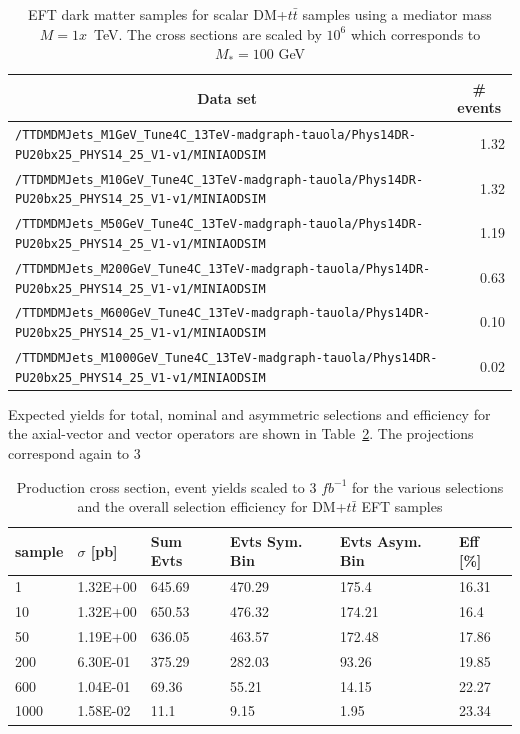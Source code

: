 \begin{table}
    \centering
    \caption{EFT dark matter samples for scalar DM+$t\bar{t}$ samples using a mediator mass $M=1x$~TeV. The cross sections are scaled by $10^6$ which corresponds to $M_*=100$ GeV \label{tab:datasets_dmtt}}
    \begin{tabular}{lr}
      \hline\hline
      \multicolumn{1}{c}{Data set}&\multicolumn{1}{c}{\# events}\tabularnewline
      \hline
      {\footnotesize \verb!/TTDMDMJets_M1GeV_Tune4C_13TeV-madgraph-tauola/Phys14DR- PU20bx25_PHYS14_25_V1-v1/MINIAODSIM!}   & 1.32 \tabularnewline
      {\footnotesize \verb!/TTDMDMJets_M10GeV_Tune4C_13TeV-madgraph-tauola/Phys14DR- PU20bx25_PHYS14_25_V1-v1/MINIAODSIM!}  & 1.32 \tabularnewline
      {\footnotesize \verb!/TTDMDMJets_M50GeV_Tune4C_13TeV-madgraph-tauola/Phys14DR- PU20bx25_PHYS14_25_V1-v1/MINIAODSIM!}  & 1.19 \tabularnewline
      {\footnotesize \verb!/TTDMDMJets_M200GeV_Tune4C_13TeV-madgraph-tauola/Phys14DR- PU20bx25_PHYS14_25_V1-v1/MINIAODSIM!} & 0.63 \tabularnewline
      {\footnotesize \verb!/TTDMDMJets_M600GeV_Tune4C_13TeV-madgraph-tauola/Phys14DR- PU20bx25_PHYS14_25_V1-v1/MINIAODSIM!} & 0.10 \tabularnewline
      {\footnotesize \verb!/TTDMDMJets_M1000GeV_Tune4C_13TeV-madgraph-tauola/Phys14DR- PU20bx25_PHYS14_25_V1-v1/MINIAODSIM!}& 0.02 \tabularnewline
      \hline \hline
\end{tabular}
\end{table}

Expected yields for total, nominal and asymmetric selections and efficiency for the axial-vector and vector operators are shown in Table~\ref{tab:dm_dmtt_EFT_g1}.
The projections correspond again to 3\fbinv

\begin{table}[h]
\centering
\begin{tabular}{llllll}
\hline
sample             & $\sigma$ [pb] & Sum Evts       & Evts Sym. Bin & Evts Asym. Bin & Eff  [\%]   \\\hline
1    & 1.32E+00 & 645.69 & 470.29 & 175.4  & 16.31 \\
10   & 1.32E+00 & 650.53 & 476.32 & 174.21 & 16.4  \\
50   & 1.19E+00 & 636.05 & 463.57 & 172.48 & 17.86 \\
200  & 6.30E-01 & 375.29 & 282.03 & 93.26  & 19.85 \\
600  & 1.04E-01 & 69.36  & 55.21  & 14.15  & 22.27\\
1000 & 1.58E-02 & 11.1   & 9.15   & 1.95   & 23.34 \\
\hline
\end{tabular}
\caption{Production cross section, event yields scaled to 3 $fb^{-1 }$ for the various selections and the overall selection efficiency for DM+$t\bar{t}$ EFT samples}
\label{tab:dm_dmtt_EFT_g1}
\end{table}


